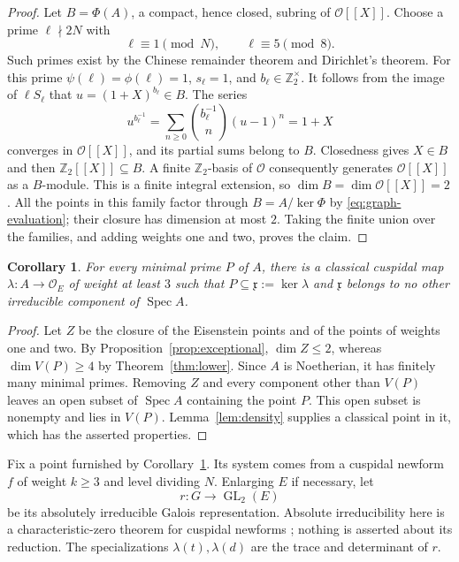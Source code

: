 \documentclass[11pt]{article}
\newtheorem{corollary}[theorem]{Corollary}
\theoremstyle{remark}
\numberwithin{equation}{section}
\newcommand{\Z}{\mathbb Z}
\newcommand{\OO}{\mathcal O}
\newcommand{\frakx}{\mathfrak x}
\DeclareMathOperator{\Spec}{Spec}
\DeclareMathOperator{\GL}{GL}
\begin{document}
\begin{proof}
Let $B=\Phi(A)$, a compact, hence closed, subring of $\OO[[X]]$.
Choose a prime $\ell\nmid2N$ with
\[
 \ell\equiv1\pmod N,\qquad \ell\equiv5\pmod8.
\]
Such primes exist by the Chinese remainder theorem and Dirichlet's
theorem. For this prime $\psi(\ell)=\phi(\ell)=1$,
$s_\ell=1$, and $b_\ell\in\Z_2^\times$. It follows from the
image of $\ell S_\ell$ that
$u=(1+X)^{b_\ell}\in B$. The series
\[
 u^{b_\ell^{-1}}=
 \sum_{n\geq0}\binom{b_\ell^{-1}}{n}(u-1)^n=1+X
\]
converges in $\OO[[X]]$, and its partial sums belong to $B$.
Closedness gives $X\in B$ and then $\Z_2[[X]]\subseteq B$.
A finite $\Z_2$-basis of $\OO$ consequently generates
$\OO[[X]]$ as a $B$-module. This is a finite integral extension,
so $\dim B=\dim\OO[[X]]=2$. All the points in this family
factor through $B=A/\ker\Phi$ by \eqref{eq:graph-evaluation};
their closure has dimension at most $2$. Taking the finite union
over the families, and adding weights one and two, proves the
claim.
\end{proof}

\begin{corollary}\label{cor:classical-point}
For every minimal prime $P$ of $A$, there is a classical cuspidal
map $\lambda:A\to\OO_E$ of weight at least $3$ such that
$P\subseteq\frakx:=\ker\lambda$ and $\frakx$ belongs to no other
irreducible component of $\Spec A$.
\end{corollary}
\begin{proof}
Let $Z$ be the closure of the Eisenstein points and of the points
of weights one and two. By Proposition~\ref{prop:exceptional},
$\dim Z\leq2$, whereas $\dim V(P)\geq4$ by
Theorem~\ref{thm:lower}. Since $A$ is Noetherian, it has finitely
many minimal primes. Removing $Z$ and every component other than
$V(P)$ leaves an open subset of $\Spec A$ containing the point
$P$. This open subset is nonempty and lies in $V(P)$.
Lemma~\ref{lem:density} supplies a classical point in it, which
has the asserted properties.
\end{proof}

Fix a point furnished by Corollary~\ref{cor:classical-point}. Its
system comes from a cuspidal newform $f$ of weight $k\geq3$ and
level dividing $N$. Enlarging $E$ if necessary, let
\begin{equation}\label{eq:r}
 r:G\longrightarrow\GL_2(E)
\end{equation}
be its absolutely irreducible Galois representation. Absolute
irreducibility here is a characteristic-zero theorem for cuspidal
newforms \cite[Theorem~2.3]{Ribet77}; nothing is asserted about its
reduction. The
specializations $\lambda(t),\lambda(d)$ are the trace and
determinant of $r$.
\end{document}
